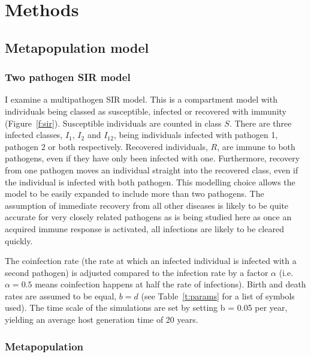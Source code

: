 \clearpage
\section{Methods}






\subsection{Metapopulation model}




\subsubsection{Two pathogen SIR model}

I examine a multipathogen SIR model. 
This is a compartment model with individuals being classed as susceptible, infected or recovered with immunity (Figure~\ref{f:sir}).
Susceptible individuals are counted in class $S$.
There are three infected classes, $I_1$, $I_2$ and $I_{12}$, being individuals infected with pathogen 1, pathogen 2 or both respectively.
Recovered individuals, $R$, are immune to both pathogens, even if they have only been infected with one.
Furthermore, recovery from one pathogen moves an individual straight into the recovered class, even if the individual is infected with both pathogen.
This modelling choice allows the model to be easily expanded to include more than two pathogens.
The assumption of immediate recovery from all other diseases is likely to be quite accurate for very closely related pathogens as is being studied here as once an acquired immune response is activated, all infections are likely to be cleared quickly.

The coinfection rate (the rate at which an infected individual is infected with a second pathogen) is adjusted compared to the infection rate by a factor $\alpha$ (i.e. $\alpha = 0.5$ means coinfection happens at half the rate of infections).
Birth and death rates are assumed to be equal, $b = d$ (see Table~\ref{t:params} for a list of symbols used).
The time scale of the simulations are set by setting b = 0.05 per year, yielding an average host generation time of 20 years.


\subsubsection{Metapopulation}


